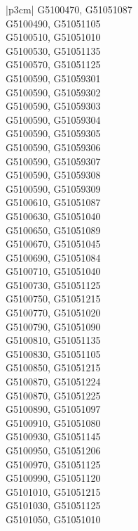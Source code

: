 \begin{customLongTable}{ |p{3cm}| }
G5100470, G51051087 \\ \hline
G5100490, G51051105 \\ \hline
G5100510, G51051010 \\ \hline
G5100530, G51051135 \\ \hline
G5100570, G51051125 \\ \hline
G5100590, G51059301 \\ \hline
G5100590, G51059302 \\ \hline
G5100590, G51059303 \\ \hline
G5100590, G51059304 \\ \hline
G5100590, G51059305 \\ \hline
G5100590, G51059306 \\ \hline
G5100590, G51059307 \\ \hline
G5100590, G51059308 \\ \hline
G5100590, G51059309 \\ \hline
G5100610, G51051087 \\ \hline
G5100630, G51051040 \\ \hline
G5100650, G51051089 \\ \hline
G5100670, G51051045 \\ \hline
G5100690, G51051084 \\ \hline
G5100710, G51051040 \\ \hline
G5100730, G51051125 \\ \hline
G5100750, G51051215 \\ \hline
G5100770, G51051020 \\ \hline
G5100790, G51051090 \\ \hline
G5100810, G51051135 \\ \hline
G5100830, G51051105 \\ \hline
G5100850, G51051215 \\ \hline
G5100870, G51051224 \\ \hline
G5100870, G51051225 \\ \hline
G5100890, G51051097 \\ \hline
G5100910, G51051080 \\ \hline
G5100930, G51051145 \\ \hline
G5100950, G51051206 \\ \hline
G5100970, G51051125 \\ \hline
G5100990, G51051120 \\ \hline
G5101010, G51051215 \\ \hline
G5101030, G51051125 \\ \hline
G5101050, G51051010 \\ \hline

\end{customLongTable}
